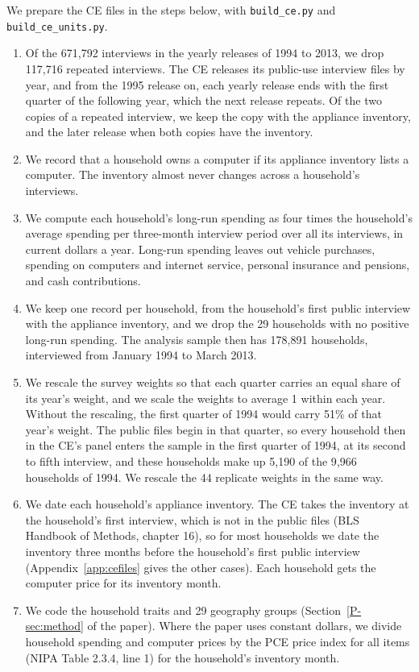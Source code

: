 \documentclass[11pt]{article}
\begin{document}
We prepare the CE files in the steps below, with \texttt{build\_ce.py} and \texttt{build\_ce\_units.py}.
\begin{enumerate}\setlength{\itemsep}{1pt}
\item Of the 671{,}792 interviews in the yearly releases of 1994 to 2013, we drop 117{,}716 repeated interviews. The CE releases its public-use interview files by year, and from the 1995 release on, each yearly release ends with the first quarter of the following year, which the next release repeats. Of the two copies of a repeated interview, we keep the copy with the appliance inventory, and the later release when both copies have the inventory.
\item We record that a household owns a computer if its appliance inventory lists a computer. The inventory almost never changes across a household's interviews.
\item We compute each household's long-run spending as four times the household's average spending per three-month interview period over all its interviews, in current dollars a year. Long-run spending leaves out vehicle purchases, spending on computers and internet service, personal insurance and pensions, and cash contributions.
\item We keep one record per household, from the household's first public interview with the appliance inventory, and we drop the 29 households with no positive long-run spending. The analysis sample then has 178{,}891 households, interviewed from January 1994 to March 2013.
\item We rescale the survey weights so that each quarter carries an equal share of its year's weight, and we scale the weights to average 1 within each year. Without the rescaling, the first quarter of 1994 would carry 51\% of that year's weight. The public files begin in that quarter, so every household then in the CE's panel enters the sample in the first quarter of 1994, at its second to fifth interview, and these households make up 5{,}190 of the 9{,}966 households of 1994. We rescale the 44 replicate weights in the same way.
\item We date each household's appliance inventory. The CE takes the inventory at the household's first interview, which is not in the public files (BLS Handbook of Methods, chapter 16), so for most households we date the inventory three months before the household's first public interview (Appendix~\ref{app:cefiles} gives the other cases). Each household gets the computer price for its inventory month.
\item We code the household traits and 29 geography groups (Section~\ref{P-sec:method} of the paper). Where the paper uses constant dollars, we divide household spending and computer prices by the PCE price index for all items (NIPA Table 2.3.4, line 1) for the household's inventory month.
\end{enumerate}
\end{document}
